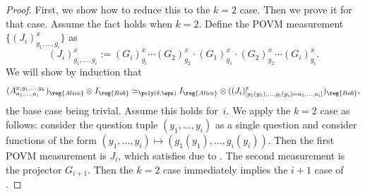 \begin{proof}
First, we show how to reduce this to the $k = 2$ case. Then we prove it for that case.
Assume the fact holds when $k = 2$.  Define the POVM measurement $\{(J_i)^x_{g_1, \ldots, g_i}\}$ as
\begin{equation*}
(J_i)^x_{g_1, \ldots, g_i} := (G_i)^x_{g_i} \cdots (G_2)^x_{g_2} \cdot (G_1)^x_{g_1} \cdot (G_2)^x_{g_2} \cdots (G_i)^x_{g_i}.
\end{equation*}
We will show by induction that 
\begin{equation}\label{eq:hi-i-work-in-graphics-but-not-that-graphics}
(A^{x, y_1, \ldots, y_k}_{a_1, \ldots, a_i})_{\reg{Alice}} \otimes I_{\reg{Bob}}
	\simeq_{\poly(\delta, \eps)} I_{\reg{Alice}} \otimes ((J_i)^x_{[g_1(y_1), \ldots, g_i(y_i) = a_1, \ldots, a_i]})_{\reg{Bob}},
\end{equation}
the base case being trivial. Assume this holds for~$i$.
We apply the $k = 2$ case as follows:
consider the question tuple $(y_1, \ldots, y_i)$ as a single question
and consider functions of the form $(y_1, \ldots, y_i) \mapsto (g_1(y_1), \ldots, g_i(y_i))$.
Then the first POVM measurement is $J_i$, which satisfies  due to .
The second measurement is the projector $G_{i+1}$.
Then the $k = 2$ case immediately implies the $i+1$ case of .


\end{proof}
